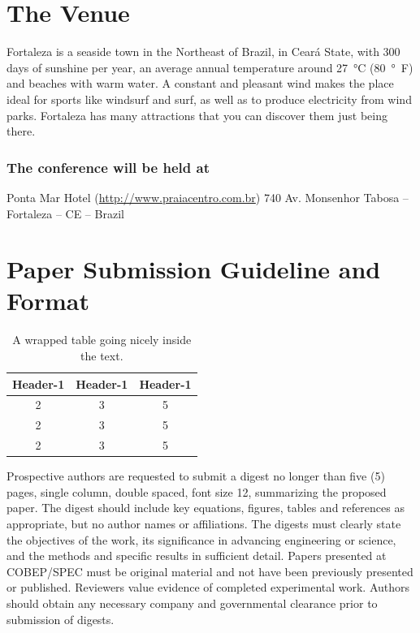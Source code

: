 \documentclass[letterpaper,oneside,onecolumn,draftclsnofoot,12pt,conference]{IEEEtran}
\begin{document}
\section{The Venue}




Fortaleza is a seaside town in the Northeast of Brazil, in Ceará State, with 300 days of sunshine per year, an average annual temperature around \SI{27}{\degreeCelsius} (\SI{80}{\degree F}) and beaches with warm water. A constant and pleasant wind makes the place ideal for sports like windsurf and surf, as well as to produce electricity from wind parks. Fortaleza has many attractions that you can discover them just being there.



\subsubsection{The conference will be held at}
Ponta Mar Hotel (\url{http://www.praiacentro.com.br}) 740 Av. Monsenhor Tabosa -- Fortaleza -- CE -- Brazil

\section{Paper Submission Guideline and Format}


\begin{table}
	\vspace{-20pt}
	\begin{center}
		\caption{A wrapped table going nicely inside the text.}\label{wrap-tab:1}
		\begin{tabular}{ccc}\\\toprule  
			Header-1 & Header-1 & Header-1 \\\midrule
			2 &3 & 5\\  \midrule
			2 &3 & 5\\  \midrule
			2 &3 & 5\\  \bottomrule
		\end{tabular}
	\end{center}
	\vspace{-20pt}
	\vspace{1pt}
\end{table} 

Prospective authors are requested to submit a digest no longer than five (5) pages, single column, double spaced, font size 12, summarizing the proposed paper. The digest should include key equations, figures, tables and references as appropriate, but no author names or affiliations. The digests must clearly state the objectives of the work, its significance in advancing engineering or science, and the methods and specific results in sufficient detail. Papers presented at COBEP/SPEC must be original material and not have been previously presented or published. Reviewers value evidence of completed experimental work. Authors should obtain any necessary company and governmental clearance prior to submission of digests.
\end{document}
